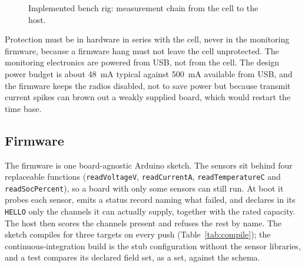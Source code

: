 \begin{figure}[htbp]
    \centering
    \caption{Implemented bench rig: measurement chain from the cell to the host.}
    \label{fig:rig}
\end{figure}

Protection must be in hardware in series with the cell, never in the monitoring firmware, because a firmware hang must not leave the cell unprotected. The monitoring electronics are powered from USB, not from the cell. The design power budget is about 48~mA typical against 500~mA available from USB, and the firmware keeps the radios disabled, not to save power but because transmit current spikes can brown out a weakly supplied board, which would restart the time base.

\subsection{Firmware}

The firmware is one board-agnostic Arduino sketch. The sensors sit behind four replaceable functions (\texttt{readVoltageV}, \texttt{readCurrentA}, \texttt{readTemperatureC} and \texttt{readSocPercent}), so a board with only some sensors can still run. At boot it probes each sensor, emits a status record naming what failed, and declares in its \texttt{HELLO} only the channels it can actually supply, together with the rated capacity. The host then scores the channels present and refuses the rest by name. The sketch compiles for three targets on every push (Table~\ref{tab:compile}); the continuous-integration build is the stub configuration without the sensor libraries, and a test compares its declared field set, as a set, against the schema.

